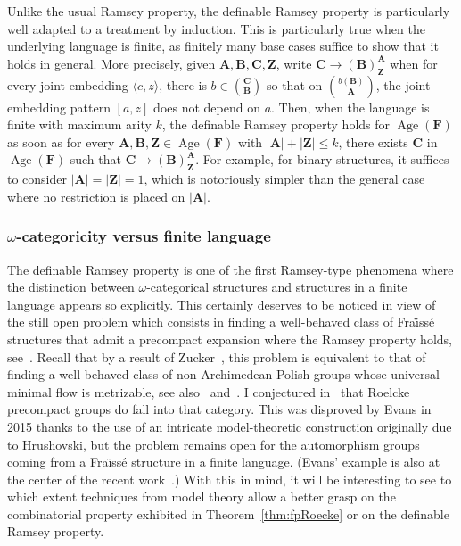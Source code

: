 \documentclass[11pt]{article}
\theoremstyle{definition}
\numberwithin{equation}{section}
\numberwithin{figure}{section}
\numberwithin{table}{section}
\newcommand*{\mA}{\mathbf{A}}
\newcommand*{\mB}{\mathbf{B}}
\newcommand*{\mC}{\mathbf{C}}
\newcommand*{\mF}{\mathbf{F}}
\newcommand*{\mZ}{\mathbf{Z}}
\DeclareMathOperator{\Age}{Age}
\begin{document}
Unlike the usual Ramsey property, the definable Ramsey property is particularly well adapted to a treatment by induction. This is particularly true when the underlying language is finite, as finitely many base cases suffice to show that it holds in general. More precisely, given $\mA, \mB, \mC, \mZ$, write $\mC \rightarrow (\mB)^{\mA}_{\mZ}$ when for every joint embedding $\langle c,z\rangle$, there is $b\in \binom{\mC}{\mB}$ so that on $\binom{b(\mB)}{\mA}$, the joint embedding pattern $[a,z]$ does not depend on $a$. Then, when the language is finite with maximum arity $k$, the definable Ramsey property holds for $\Age(\mF)$ as soon as for every $\mA, \mB, \mZ \in \Age(\mF)$ with $|\mA|+|\mZ|\leq k$, there exists $\mC$ in $\Age(\mF)$ such that $\mC \rightarrow (\mB)^{\mA}_{\mZ}$. For example, for binary structures, it suffices to consider $|\mA|=|\mZ|=1$, which is notoriously simpler than the general case where no restriction is placed on $|\mA|$.

\subsubsection{\texorpdfstring{$\omega$}{omega}-categoricity versus finite language}

The definable Ramsey property is one of the first Ramsey-type phenomena where the distinction between $\omega$-categorical structures and structures in a finite language appears so explicitly. This certainly deserves to be noticed in view of the still open problem which consists in finding a well-behaved class of Fra\"{\i}ss\'e structures that admit a precompact expansion where the Ramsey property holds, see~\cite{BPT}. Recall that by a result of Zucker~\cite{Z2}, this problem is equivalent to that of finding a well-behaved class of non-Archimedean Polish groups whose universal minimal flow is metrizable, see also~\cite{MNT} and~\cite{BYMT}. I conjectured in~\cite{NVT6} that Roelcke precompact groups do fall into that category. This was disproved by Evans in 2015 thanks to the use of an intricate model-theoretic construction originally due to Hrushovski, but the problem remains open for the automorphism groups coming from a Fra\"{\i}ss\'e structure in a finite language. (Evans' example is also at the center of the recent work~\cite{EHN}.) With this in mind, it will be interesting to see to which extent techniques from model theory allow a better grasp on the combinatorial property exhibited in Theorem~\ref{thm:fpRoecke} or on the definable Ramsey property.
\end{document}
